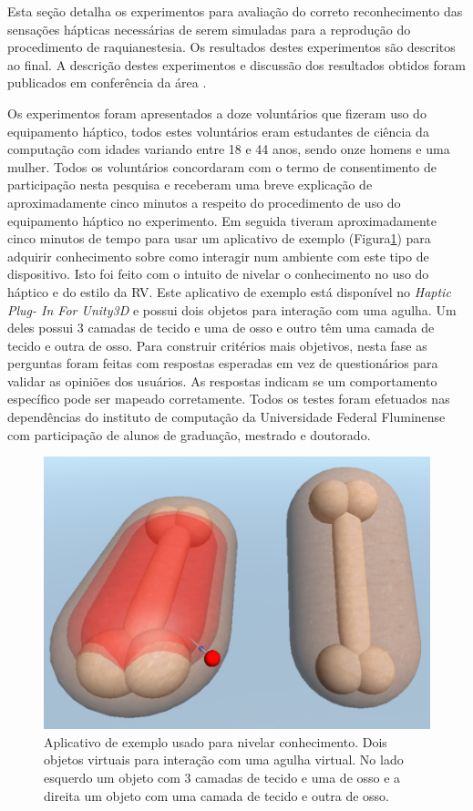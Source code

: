 Esta seção detalha os experimentos para avaliação do correto reconhecimento das sensações hápticas necessárias de serem simuladas para a reprodução do procedimento de raquianestesia. Os resultados destes experimentos são descritos ao final. A descrição destes experimentos e discussão dos resultados obtidos foram publicados em conferência da área \cite{Melo2021}. 

Os experimentos foram apresentados a doze voluntários que fizeram uso do equipamento háptico, todos estes voluntários eram estudantes de ciência da computação com idades variando entre 18 e 44 anos, sendo onze homens e uma mulher. Todos os voluntários concordaram com o termo de consentimento de participação nesta pesquisa e receberam uma breve explicação de aproximadamente cinco minutos a respeito do procedimento de uso do equipamento háptico no experimento. Em seguida tiveram aproximadamente cinco minutos de tempo para usar um aplicativo de exemplo (Figura\ref{fig:aplicativoExemplo}) para adquirir conhecimento sobre como interagir num ambiente com este tipo de dispositivo. Isto foi feito com o intuito de nivelar o conhecimento no uso do háptico e do estilo da \acrshort{RV}. Este aplicativo de exemplo está disponível no \textit{Haptic Plug-
In For Unity3D} \cite{Poyade2014} e possui dois objetos para interação com uma agulha. Um deles possui 3 camadas de tecido e uma de osso e outro têm uma camada de tecido e outra de osso. Para construir critérios mais objetivos, nesta fase as perguntas foram feitas com respostas esperadas em vez de questionários para validar as opiniões dos usuários. As respostas indicam se um comportamento específico pode ser mapeado corretamente.
Todos os testes foram efetuados
nas dependências do instituto de computação da Universidade Federal Fluminense com participação de alunos de graduação, mestrado e doutorado.

\begin{figure}[ht!]
    \centering
    \includegraphics[width=0.6\linewidth]{capitulos/figuras/aplicativo-exemplo.png} 
    \caption{Aplicativo de exemplo usado para nivelar conhecimento. Dois objetos virtuais para interação com uma agulha virtual. No lado esquerdo um objeto com 3 camadas de tecido e uma de osso e a direita um objeto com uma camada de tecido e outra de osso.}
    \label{fig:aplicativoExemplo}
\end{figure}


